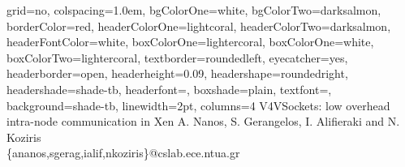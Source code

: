 \documentclass[a0paper,portrait,final]{baposter}
\begin{document}
\newlength{\leftimgwidth}
\begin{poster}%
  {
  grid=no,
  colspacing=1.0em,
  bgColorOne=white,
  bgColorTwo=darksalmon,
  borderColor=red,
  headerColorOne=lightcoral,
  headerColorTwo=darksalmon,
  headerFontColor=white,
  boxColorOne=lightercoral,
  boxColorOne=white,
  boxColorTwo=lightercoral,
  textborder=roundedleft,
  eyecatcher=yes,
  headerborder=open,
  headerheight=0.09\textheight,
  headershape=roundedright,
  headershade=shade-tb,
  headerfont=\Large\textsf, %
  boxshade=plain,
  textfont={\sf },
  background=shade-tb,
  linewidth=2pt,
  columns=4
  }
  {
   }
  {V4VSockets: low overhead intra-node communication in Xen}
  {A. Nanos, S. Gerangelos, I. Alifieraki and N. Koziris\\ \{ananos,sgerag,ialif,nkoziris\}@cslab.ece.ntua.gr}
  {   
   }


\end{poster}
\end{document}
